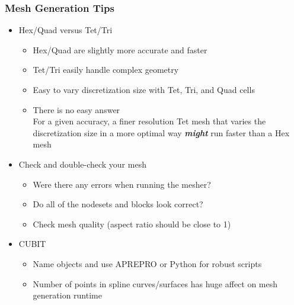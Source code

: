 \documentclass{beamer}
\begin{document}
\begin{frame}
  \frametitle{Mesh Generation Tips}
 
  \begin{itemize}
  \item Hex/Quad versus Tet/Tri
    \begin{itemize}
    \item Hex/Quad are slightly more accurate and faster
    \item Tet/Tri easily handle complex geometry
    \item Easy to vary discretization size with Tet, Tri, and Quad cells
    \item There is no easy answer\\
      For a given accuracy, a finer resolution Tet mesh that varies
      the discretization size in a more optimal way {\bf\it might} run
      faster than a Hex mesh
    \end{itemize}
  \item Check and double-check your mesh
    \begin{itemize}
    \item Were there any errors when running the mesher?
    \item Do all of the nodesets and blocks look correct?
    \item Check mesh quality (aspect ratio should be close to 1)
    \end{itemize}
  \item CUBIT
    \begin{itemize}
    \item Name objects and use APREPRO or Python for robust scripts
    \item Number of points in spline curves/surfaces has huge affect
      on mesh generation runtime
    \end{itemize}
  \end{itemize}

\end{frame}
\end{document}
